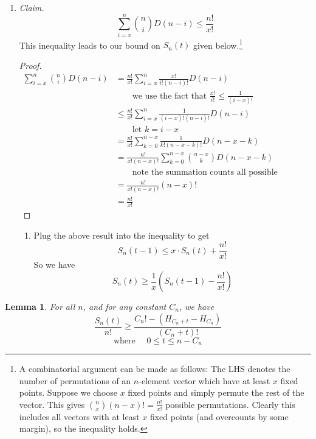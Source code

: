 \documentclass[12pt, a4paper]{article}
\newtheorem{lemma}{Lemma}
\begin{document}
\begin{enumerate}
		\item\textit{Claim.}
			\begin{equation*}
			\sum_{i=x}^n\binom{n}{i}D(n-i) \le \frac{n!}{x!}
			\end{equation*}
			This inequality leads to our bound on $S_{n}(t)$ given
			below.\footnote{A combinatorial argument can be made as follows: The LHS
			denotes the number of permutations of an $n$-element vector which have
			at least $x$ fixed points. Suppose we choose $x$ fixed points and
			simply permute the rest of the vector. This gives $\binom{n}{x}(n-x)!
			=\frac{n!}{x!}$ possible permutations. Clearly this includes all
			vectors with at least $x$ fixed points (and overcounts by some
			margin), so the inequality holds.}
			\begin{proof}
				\begin{align*}
				\sum_{i=x}^n\binom{n}{i}D(n-i) & =
				\frac{n!}{x!}\sum_{i=x}^{n}\frac{x!}{i!(n-i)!}D(n-i)\\
				& \qquad\text{we use the fact that }\frac{x!}{i!}\le\frac{1}{(i-x)!}\\
				& \le \frac{n!}{x!}\sum_{i=x}^{n}\frac{1}{(i-x)!(n-i)!}D(n-i)\\
				& \qquad\text{let $k=i-x$}\\
				& = \frac{n!}{x!}\sum_{k=0}^{n-x}\frac{1}{k!(n-x-k)!}D(n-x-k)\\
				& = \frac{n!}{x!(n-x)!}\sum_{k=0}^{n-x}\binom{n-x}{k}D(n-x-k)\\
				& \qquad\text{note the summation counts all possible permutations}\\
				& = \frac{n!}{x!(n-x)!}(n-x)!\\
				& = \frac{n!}{x!}				
				\end{align*}
			\end{proof}		
		\begin{enumerate}
		\item Plug the above result into the inequality to get
			\begin{equation*}
			S_{n}(t-1) \le x\cdot S_{n}(t) + \frac{n!}{x!}
			\end{equation*}
		So we have
			\begin{equation*}
			S_{n}(t)\ge \frac{1}{x}\left(S_{n}(t-1)-\frac{n!}{x!}\right)
			\end{equation*}
		\end{enumerate}
	\end{enumerate}
		\begin{lemma} For all $n$, and for any constant $C_n$, we have
			\begin{equation*}
			\frac{S_{n}(t)}{n!}\ge \frac{C_{n}! - (H_{C_{n}+t} - H_{C_{n}})}{(C_n+t)!}
			\end{equation*}
			\begin{equation*}
			\text{where }\quad0\le t\le n-C_{n}
			\end{equation*}
		\end{lemma}
\end{document}
